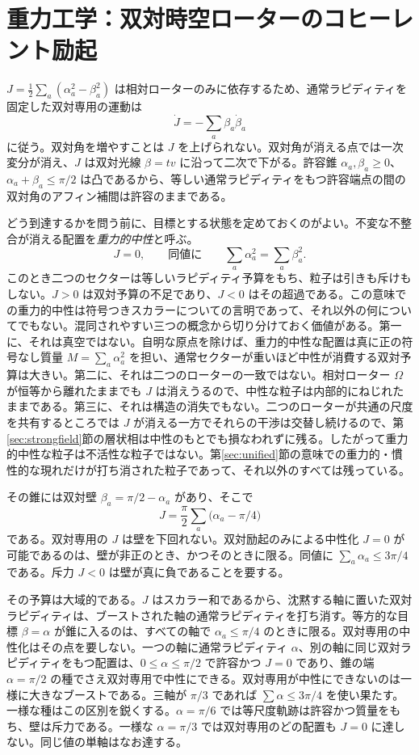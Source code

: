 \documentclass[a4paper]{article}
\begin{document}
\section{重力工学：双対時空ローターのコヒーレント励起}
\label{sec:gravitycontrol}

$J=\tfrac12\sum_a(\alpha_a^2-\beta_a^2)$ は相対ローターのみに依存するため、通常ラピディティを固定した双対専用の運動は
\[
\dot J=-\sum_a\beta_a\dot\beta_a
\]
に従う。双対角を増やすことは $J$ を上げられない。双対角が消える点では一次変分が消え、$J$ は双対光線 $\beta=tv$ に沿って二次で下がる。許容錐 $\alpha_a,\beta_a\ge 0$、$\alpha_a+\beta_a\le\pi/2$ は凸であるから、等しい通常ラピディティをもつ許容端点の間の双対角のアフィン補間は許容のままである。

どう到達するかを問う前に、目標とする状態を定めておくのがよい。不変な不整合が消える配置を\emph{重力的中性}と呼ぶ。
\begin{equation}
\label{eq:neutral-def}
J=0,\qquad\text{同値に}\qquad\sum_a\alpha_a^2=\sum_a\beta_a^2 .
\end{equation}
このとき二つのセクターは等しいラピディティ予算をもち、粒子は引きも斥けもしない。$J>0$ は双対予算の不足であり、$J<0$ はその超過である。この意味での重力的中性は符号つきスカラーについての言明であって、それ以外の何についてでもない。混同されやすい三つの概念から切り分けておく価値がある。第一に、それは真空ではない。自明な原点を除けば、重力的中性な配置は真に正の符号なし質量 $M=\sum_a\alpha_a^2$ を担い、通常セクターが重いほど中性が消費する双対予算は大きい。第二に、それは二つのローターの一致ではない。相対ローター $\Omega$ が恒等から離れたままでも $J$ は消えうるので、中性な粒子は内部的にねじれたままである。第三に、それは構造の消失でもない。二つのローターが共通の尺度を共有するところでは $J$ が消える一方でそれらの干渉は交替し続けるので、第\ref{sec:strongfield}節の層状相は中性のもとでも損なわれずに残る。したがって重力的中性な粒子は不活性な粒子ではない。第\ref{sec:unified}節の意味での重力的・慣性的な現れだけが打ち消された粒子であって、それ以外のすべては残っている。

その錐には双対壁 $\beta_a=\pi/2-\alpha_a$ があり、そこで
\[
J=\frac\pi2\sum_a\bigl(\alpha_a-\pi/4\bigr)
\]
である。双対専用の $J$ は壁を下回れない。双対励起のみによる中性化 $J=0$ が可能であるのは、壁が非正のとき、かつそのときに限る。同値に $\sum_a\alpha_a\le 3\pi/4$ である。斥力 $J<0$ は壁が真に負であることを要する。

その予算は大域的である。$J$ はスカラー和であるから、沈黙する軸に置いた双対ラピディティは、ブーストされた軸の通常ラピディティを打ち消す。等方的な目標 $\beta=\alpha$ が錐に入るのは、すべての軸で $\alpha_a\le\pi/4$ のときに限る。双対専用の中性化はその点を要しない。一つの軸に通常ラピディティ $\alpha$、別の軸に同じ双対ラピディティをもつ配置は、$0\le\alpha\le\pi/2$ で許容かつ $J=0$ であり、錐の端 $\alpha=\pi/2$ の種でさえ双対専用で中性にできる。双対専用が中性にできないのは一様に大きなブーストである。三軸が $\pi/3$ であれば $\sum\alpha\le 3\pi/4$ を使い果たす。一様な種はこの区別を鋭くする。$\alpha=\pi/6$ では等尺度軌跡は許容かつ質量をもち、壁は斥力である。一様な $\alpha=\pi/3$ では双対専用のどの配置も $J=0$ に達しない。同じ値の単軸はなお達する。
\end{document}
